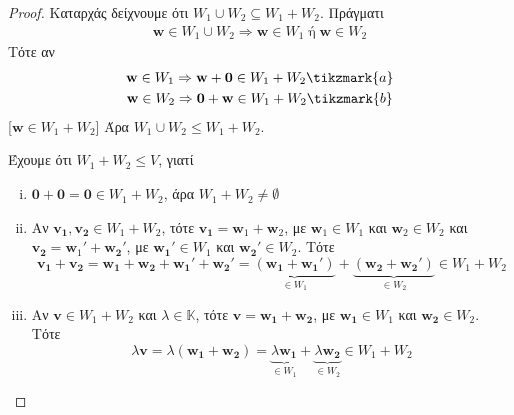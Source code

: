 \begin{proof}
\item {}
    Καταρχάς δείχνουμε ότι $ W_{1} \cup W_{2} \subseteq W_{1}+W_{2} $. Πράγματι
    \begin{gather*}
        \mathbf{w} \in W_{1} \cup W_{2} \Rightarrow \mathbf{w} \in W_{1} \; \text{ή} \; 
        \mathbf{w} \in W_{2} 
    \end{gather*}
    Τότε αν
    \begin{gather*}
        \mathbf{w} \in W_{1} \Rightarrow \mathbf{w} + \mathbf{0} \in W_{1}+W_{2} 
        \tikzmark{a} \\
        \mathbf{w} \in W_{2} \Rightarrow \mathbf{0} + \mathbf{w} \in W_{1}+W_{2} 
        \tikzmark{b}
    \end{gather*}
    [$ \mathbf{w} \in W_{1}+W_{2} $]
    Άρα $ W_{1} \cup W_{2} \leq W_{1}+W_{2} $.
    \begin{myitemize}
    \item 
        Έχουμε ότι $ W_{1}+W_{2} \leq V $, γιατί
        \begin{enumerate}[i)]
            \item $ \mathbf{0}+ \mathbf{0} = \mathbf{0} \in W_{1}+W_{2} $, άρα 
                $ W_{1}+W_{2} \neq \emptyset $
            \item Αν $ \mathbf{v_{1}}, \mathbf{v_{2}} \in W_{1}+W_{2} $, τότε 
                $ \mathbf{v_{1}} = \mathbf{w}_{1}+ \mathbf{w}_{2} $, με 
                $ \mathbf{w}_{1} \in W_{1} $ και $ \mathbf{w}_{2} \in W_{2} $ και 
                $ \mathbf{v_{2}} = \mathbf{w}_{1}' + \mathbf{w_{2}}' $, με 
                $ \mathbf{w_{1}}' \in W_{1} $ και $ \mathbf{w_{2}}' \in W_{2} $. Τότε
                \[
                    \mathbf{v_{1}}+ \mathbf{v_{2}} = \mathbf{w_{1}}+ \mathbf{w_{2}} + 
                    \mathbf{w_{1}}' + \mathbf{w_{2}}' = \underbrace{(\mathbf{w_{1}}+
                        \mathbf{w_{1}}')}_{\in W_{1}} + \underbrace{(\mathbf{w_{2}}+ 
                    \mathbf{w_{2}}')}_{\in W_{2}} \in W_{1}+W_{2}
                \] 
            \item Αν $ \mathbf{v} \in W_{1}+W_{2} $ και $ \lambda \in \mathbb{K} $, 
                τότε $ \mathbf{v} = \mathbf{w_{1}}+ \mathbf{w_{2}} $, με 
                $ \mathbf{w_{1}} \in W_{1} $ και $ \mathbf{w_{2}} \in W_{2} $.  Τότε
                \[
                    \lambda \mathbf{v} = \lambda (\mathbf{w_{1}}+ \mathbf{w_{2}}) = 
                    \underbrace{\lambda \mathbf{w_{1}}}_{\in W_{1}} + 
                    \underbrace{\lambda \mathbf{w_{2}}}_{\in W_{2}} \in W_{1}+W_{2}
                \] 
        \end{enumerate}


\end{myitemize}
\end{proof}
